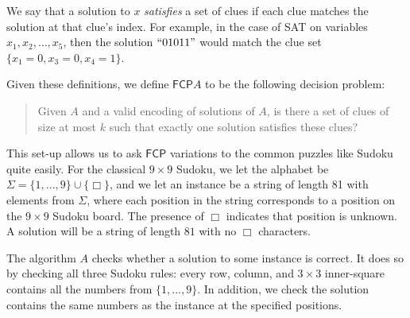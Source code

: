 \documentclass[runningheads,a4paper]{llncs}
\begin{document}
We say that a solution to $x$ \emph{satisfies} a set of clues if each clue matches the solution at that clue's index. For example, in the case of SAT on variables $x_1,x_2,\dots,x_5$, then the solution $``01011"$ would match the clue set $\{x_1 = 0,x_3 = 0,x_4 = 1\}$.

Given these definitions, we define $\mathsf{FCP} A$ to be the following decision problem:
\begin{quote}
Given $A$ and a valid encoding of solutions of $A$, is there a set of clues of size at most $k$ such that exactly one solution satisfies these clues?
\end{quote}
%
%
%

This set-up allows us to ask $\mathsf{FCP}$ variations to the common puzzles like Sudoku quite easily. For the classical $9 \times 9$ Sudoku, we let the alphabet be $\Sigma = \{ 1, ..., 9 \} \cup \{ \Box \}$, and we let an instance be a string of length 81 with elements from $\Sigma$, where each position in the string corresponds to a position on the $9 \times 9$ Sudoku board. The presence of $\Box$ indicates that position is unknown. A solution will be a string of length $81$ with no $\Box$ characters. 

The algorithm $A$ checks whether a solution to some instance is correct. It does so by checking all three Sudoku rules: every row, column, and $3 \times 3$ inner-square contains all the numbers from $\{1 , ..., 9\}$. In addition, we check the solution contains the same numbers as the instance at the specified positions.
\end{document}
